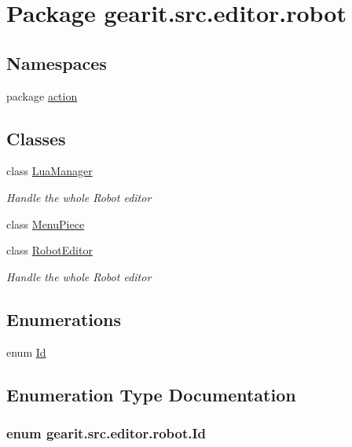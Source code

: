 \hypertarget{namespacegearit_1_1src_1_1editor_1_1robot}{\section{Package gearit.\+src.\+editor.\+robot}
\label{namespacegearit_1_1src_1_1editor_1_1robot}
}
\subsection*{Namespaces}
\begin{DoxyCompactItemize}
\item 
package \hyperlink{namespacegearit_1_1src_1_1editor_1_1robot_1_1action}{action}
\end{DoxyCompactItemize}
\subsection*{Classes}
\begin{DoxyCompactItemize}
\item 
class \hyperlink{classgearit_1_1src_1_1editor_1_1robot_1_1_lua_manager}{Lua\+Manager}
\begin{DoxyCompactList}\small\item\em Handle the whole Robot editor \end{DoxyCompactList}\item 
class \hyperlink{classgearit_1_1src_1_1editor_1_1robot_1_1_menu_piece}{Menu\+Piece}
\item 
class \hyperlink{classgearit_1_1src_1_1editor_1_1robot_1_1_robot_editor}{Robot\+Editor}
\begin{DoxyCompactList}\small\item\em Handle the whole Robot editor \end{DoxyCompactList}\end{DoxyCompactItemize}
\subsection*{Enumerations}
\begin{DoxyCompactItemize}
\item 
enum \hyperlink{namespacegearit_1_1src_1_1editor_1_1robot_a807597c07a2bb2873079c5528afd0843}{Id} 
\end{DoxyCompactItemize}


\subsection{Enumeration Type Documentation}
\hypertarget{namespacegearit_1_1src_1_1editor_1_1robot_a807597c07a2bb2873079c5528afd0843}{
\subsubsection[{Id}]{\setlength{\rightskip}{0pt plus 5cm}enum {\bf gearit.\+src.\+editor.\+robot.\+Id}}}\label{namespacegearit_1_1src_1_1editor_1_1robot_a807597c07a2bb2873079c5528afd0843}
